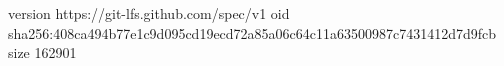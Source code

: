 version https://git-lfs.github.com/spec/v1
oid sha256:408ca494b77e1c9d095cd19ecd72a85a06c64c11a63500987c7431412d7d9fcb
size 162901
